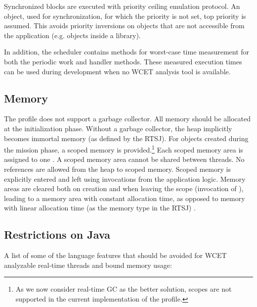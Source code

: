 Synchronized blocks are executed with priority ceiling emulation
protocol. An object, used for synchronization, for which the
priority is not set, top priority is assumed. This avoids priority
inversions on objects that are not accessible from the application
(e.g. objects inside a library).

In addition, the scheduler contains methods for worst-case time
measurement for both the periodic work and handler methods. These
measured execution times can be used during development when no WCET
analysis tool is available.

\subsection{Memory}

The profile does not support a garbage collector. All memory should
be allocated at the initialization phase. Without a garbage
collector, the heap implicitly becomes immortal memory (as defined by
the RTSJ). For objects created during the mission phase, a scoped
memory is provided.\footnote{As we now consider real-time GC as the
better solution, scopes are not supported in the current
implementation of the profile.} Each scoped memory area is assigned
to one . A scoped memory area cannot be shared between
threads. No references are allowed from the heap to scoped memory.
Scoped memory is explicitly entered and left using invocations from
the application logic. Memory areas are cleared both on creation and
when leaving the scope (invocation of ), leading
to a memory area with constant allocation time, as opposed to memory
with linear allocation time (as the memory type  in
the RTSJ) \cite{Corsaro:2003:DPR}.


\subsection{Restrictions on Java}

A list of some of the language features that should be avoided for
WCET analyzable real-time threads and bound memory usage:

